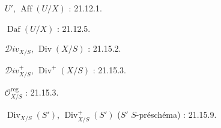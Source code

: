 $U'$, $\operatorname{Aff}(U/X)$ : 21.12.1.

$\operatorname{Daf}(U/X)$ : 21.12.5.

$\mathcal{D}iv_{X/S}$, $\operatorname{Div}(X/S)$ : 21.15.2.

$\mathcal{D}iv_{X/S}^+$, $\operatorname{Div}^+(X/S)$ : 21.15.3.

$\mathcal O_{X/S}^{\mathrm{reg}}$ : 21.15.3.

$\operatorname{Div}_{X/S}(S')$, $\operatorname{Div}_{X/S}^+(S')$
($S'$ $S$-préschéma) : 21.15.9.

\endgroup

\clearpage
